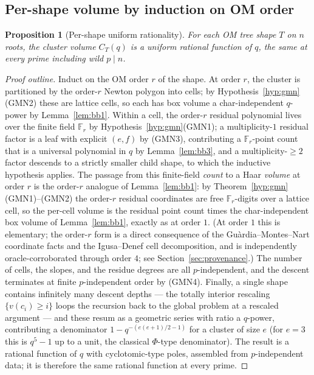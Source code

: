 \documentclass[pdflatex,sn-mathphys-num]{sn-jnl}%
\newcommand{\bbF}{\mathbb{F}}
\theoremstyle{plain}
\newtheorem{proposition}[theorem]{Proposition}
\theoremstyle{definition}
\theoremstyle{remark}
\numberwithin{equation}{section}
\begin{document}
\subsection{Per-shape volume by induction on OM order}\label{sec:bb3inf}

\begin{proposition}[Per-shape uniform rationality]\label{prop:per-shape}
For each OM tree shape $T$ on $n$ roots, the
cluster volume $C_{T}(q)$ is a uniform rational function of $q$, the same at every
prime including wild $p\mid n$.
\end{proposition}

\begin{proof}[Proof outline]
Induct on the OM order $r$ of the shape. At order $r$, the cluster is partitioned
by the order-$r$ Newton polygon into cells; by Hypothesis~\ref{hyp:gmn}(GMN2)
these are lattice cells, so each has box volume a char-independent $q$-power by
Lemma~\ref{lem:bb1}. Within a cell, the order-$r$ residual polynomial lives over
the finite field $\bbF_{r}$ by Hypothesis~\ref{hyp:gmn}(GMN1); a multiplicity-$1$
residual factor is a leaf with explicit $(e,f)$ by (GMN3), contributing a
$\bbF_{r}$-point count that is a universal polynomial in $q$ by Lemma~\ref{lem:bb3},
and a multiplicity-$\ge2$ factor descends to a strictly smaller child shape, to
which the inductive hypothesis applies. The passage from this finite-field
\emph{count} to a Haar \emph{volume} at order $r$ is the order-$r$ analogue of
Lemma~\ref{lem:bb1}: by Theorem~\ref{hyp:gmn}(GMN1)--(GMN2) the order-$r$ residual
coordinates are free $\bbF_{r}$-digits over a lattice cell, so the per-cell volume
is the residual point count times the char-independent box volume of
Lemma~\ref{lem:bb1}, exactly as at order $1$. (At order $1$ this is elementary; the
order-$r$ form is a direct consequence of the Gu\`ardia--Montes--Nart coordinate
facts and the Igusa--Denef cell decomposition, and is independently
oracle-corroborated through order $4$; see Section~\ref{sec:provenance}.) The number
of cells, the slopes, and the residue degrees are all $p$-independent, and the
descent terminates at finite $p$-independent order by (GMN4). Finally, a single shape contains infinitely many
descent depths --- the totally interior rescaling $\{v(c_{i})\ge i\}$ loops the
recursion back to the global problem at a rescaled argument --- and these resum as
a geometric series with ratio a $q$-power, contributing a denominator
$1-q^{-(e(e+1)/2-1)}$ for a cluster of size $e$ (for $e=3$ this is $q^{5}-1$ up to
a unit, the classical $\Phi$-type denominator). The result is a rational function
of $q$ with cyclotomic-type poles, assembled from $p$-independent data; it is
therefore the same rational function at every prime.
\end{proof}
\end{document}
